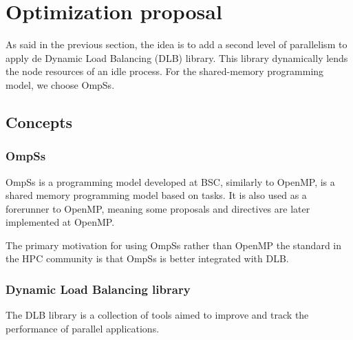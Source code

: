\section{Optimization proposal}
As said in the previous section, the idea is to add a second level of parallelism to apply de Dynamic Load Balancing (DLB) library. This library dynamically lends the node resources of an idle process. For the shared-memory programming model, we choose OmpSs.

\subsection{Concepts}

\subsubsection{OmpSs}
OmpSs\cite{ompss} is a programming model developed at BSC, similarly to OpenMP, is a shared memory programming model based on tasks. It is also used as a forerunner to OpenMP, meaning some proposals and directives are later implemented at OpenMP.


The primary motivation for using OmpSs rather than OpenMP the standard in the HPC community is that OmpSs is better integrated with DLB.

\subsubsection{Dynamic Load Balancing library}
The DLB library\cite{dlb} is a collection of tools aimed to improve and track the performance of parallel applications. 

